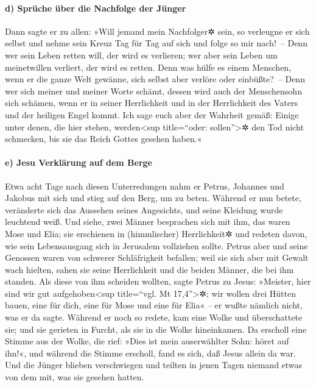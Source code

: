 \hypertarget{d-spruxfcche-uxfcber-die-nachfolge-der-juxfcnger}{%
\paragraph{d) Sprüche über die Nachfolge der
Jünger}\label{d-spruxfcche-uxfcber-die-nachfolge-der-juxfcnger}}

 Dann sagte er zu allen: »Will jemand mein Nachfolger✲
sein, so verleugne er sich selbst und nehme sein Kreuz Tag für Tag auf
sich und folge so mir nach!~--  Denn wer sein Leben
retten will, der wird es verlieren; wer aber sein Leben um meinetwillen
verliert, der wird es retten.  Denn was hülfe es einem
Menschen, wenn er die ganze Welt gewänne, sich selbst aber verlöre oder
einbüßte?~--  Denn wer sich meiner und meiner Worte
schämt, dessen wird auch der Menschensohn sich schämen, wenn er in
seiner Herrlichkeit und in der Herrlichkeit des Vaters und der heiligen
Engel kommt.  Ich sage euch aber der Wahrheit gemäß:
Einige unter denen, die hier stehen, werden\textless sup title=``oder:
sollen''\textgreater✲ den Tod nicht schmecken, bis sie das Reich Gottes
gesehen haben.«

\hypertarget{e-jesu-verkluxe4rung-auf-dem-berge}{%
\paragraph{e) Jesu Verklärung auf dem
Berge}\label{e-jesu-verkluxe4rung-auf-dem-berge}}

 Etwa acht Tage nach diesen Unterredungen nahm er Petrus,
Johannes und Jakobus mit sich und stieg auf den Berg, um zu beten.
 Während er nun betete, veränderte sich das Aussehen
seines Angesichts, und seine Kleidung wurde leuchtend weiß.
 Und siehe, zwei Männer besprachen sich mit ihm, das
waren Mose und Elia;  sie erschienen in (himmlischer)
Herrlichkeit✲ und redeten davon, wie sein Lebensausgang sich in
Jerusalem vollziehen sollte.  Petrus aber und seine
Genossen waren von schwerer Schläfrigkeit befallen; weil sie sich aber
mit Gewalt wach hielten, sahen sie seine Herrlichkeit und die beiden
Männer, die bei ihm standen.  Als diese von ihm scheiden
wollten, sagte Petrus zu Jesus: »Meister, hier sind wir gut
aufgehoben\textless sup title=``vgl. Mt 17,4''\textgreater✲; wir wollen
drei Hütten bauen, eine für dich, eine für Mose und eine für Elia« -- er
wußte nämlich nicht, was er da sagte.  Während er noch so
redete, kam eine Wolke und überschattete sie; und sie gerieten in
Furcht, als sie in die Wolke hineinkamen.  Da erscholl
eine Stimme aus der Wolke, die rief: »Dies ist mein auserwählter Sohn:
höret auf ihn!«,  und während die Stimme erscholl, fand
es sich, daß Jesus allein da war. Und die Jünger blieben verschwiegen
und teilten in jenen Tagen niemand etwas von dem mit, was sie gesehen
hatten.

